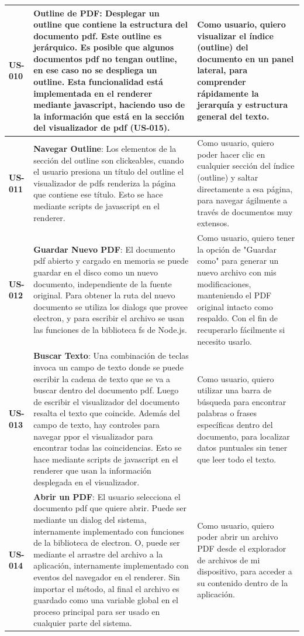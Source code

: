 \begin{longtable}{|l||p{7cm}|p{4.5cm}|}
\hline
\hline
\textbf{US-010} & \textbf{Outline de PDF}:  Desplegar un outline que contiene la estructura del documento pdf. Este outline es jerárquico. Es posible que algunos documentos pdf no tengan outline, en ese caso no se despliega un outline. Esta funcionalidad está implementada en el renderer mediante javascript, haciendo uso de la información que está en la sección del visualizador de pdf (US-015). &  Como usuario, quiero visualizar el índice (outline) del documento en un panel lateral, para comprender rápidamente la jerarquía y estructura general del texto.\\
\hline
\hline
\textbf{US-011} & \textbf{Navegar Outline}: Los elementos de la sección del outline son clickeables, cuando el usuario presiona un título del outline el visualizador de pdfs renderiza la página que contiene ese título. Esto se hace mediante scripts de javascript en el renderer. & Como usuario, quiero poder hacer clic en cualquier sección del índice (outline) y saltar directamente a esa página, para navegar ágilmente a través de documentos muy extensos.\\
\hline
\hline
\textbf{US-012} & \textbf{Guardar Nuevo PDF}:  El documento pdf abierto y cargado en memoria se puede guardar en el disco como un nuevo documento, independiente de la fuente original. Para obtener la ruta del nuevo documento se utiliza los dialogs que provee electron, y para escribir el archivo se usan las funciones de la biblioteca fs de Node.js. & Como usuario, quiero tener la opción de "Guardar como" para generar un nuevo archivo con mis modificaciones, manteniendo el PDF original intacto como respaldo. Con el fin de recuperarlo fácilmente si necesito usarlo. \\
\hline
\hline
\textbf{US-013} & \textbf{Buscar Texto}: Una combinación de teclas invoca un campo de texto donde se puede escribir la cadena de texto que se va a buscar dentro del documento pdf. Luego de escribir el visualizador del documento resalta el texto que coincide. Además del campo de texto, hay controles para navegar ppor el visualizador para encontrar todas las coincidencias. Esto se hace mediante scripts de javascript en el renderer que usan la información desplegada en el visualizador. & Como usuario, quiero utilizar una barra de búsqueda para encontrar palabras o frases específicas dentro del documento, para localizar datos puntuales sin tener que leer todo el texto.\\
\hline
\hline
\textbf{US-014} & \textbf{Abrir un PDF}:  El usuario selecciona el documento pdf que quiere abrir. Puede ser mediante un dialog del sistema, internamente implementado con funciones de la biblioteca de electron. O, puede ser mediante el arrastre del archivo a la aplicación, internamente implementado con eventos del navegador en el renderer. Sin importar el método, al final el archivo es guardado como una variable global en el proceso principal para ser usado en cualquier parte del sistema. & Como usuario, quiero poder abrir un archivo PDF desde el explorador de archivos de mi dispositivo, para acceder a su contenido dentro de la aplicación.\\

\end{longtable}
